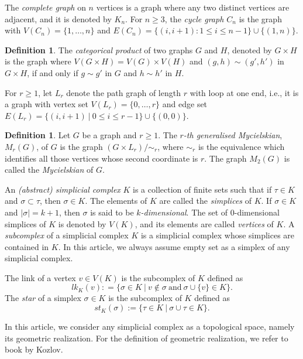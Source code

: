 \documentclass[12pt]{article}
\numberwithin{thm}{section}
\theoremstyle{definition}
\newtheorem{defn}[thm]{Definition}
\begin{document}
	The {\it complete graph} on $n$ vertices is a graph where any two distinct vertices are adjacent, and it is denoted by $K_n$. For $n \geq 3$, the {\it cycle graph $C_n$} is the graph with $V(C_n) = \{1, \ldots, n\}$ and $E(C_n) = \{(i, i+1) : 1 \leq i \leq n-1\} \cup \{(1, n)\}$. 


 \begin{defn} \label{def:product}
	The {\it categorical product} of two graphs $G$ and $H$, denoted by $G\times H$ is the graph where $V(G\times H)=V(G)\times V(H)$ and  $(g,h) \sim (g',h')$ in $G\times H$, if and only if $g \sim g'$ in $G$ and $h \sim h'$ in $H$.
\end{defn}

For $r \geq 1$, let $L_r$ denote the path graph of length $r$ with loop at one end, i.e., it is a graph with  vertex set $V(L_r) = \{0, \ldots, r\}$ and  edge set $E(L_r) = \{(i,i+1) \ |  \ 0 \leq i \leq r-1\} \cup \{(0,0)\}$. 

\begin{defn} \label{defn:mycielskian}Let $G$ be  a graph and $r \geq 1$. The {\it $r$-th generalised Mycielskian}, $M_r(G)$, of $G$ is the graph $(G \times L_r) / \sim_{r}$,  where $\sim_r$ is the equivalence which identifies all those vertices whose second coordinate is $r$.  The graph $M_2(G)$ is called the {\it Mycielskian}  of $G$. 
\end{defn} 

An {\it (abstract) simplicial complex} $K$ is a collection of finite sets such that if $\tau \in K$ and $\sigma \subset \tau$, then $\sigma \in K$. The elements  of $K$ are called the  {\it simplices} of $K$.  If $\sigma \in K$ and $|\sigma |=k+1$, then $\sigma$ is said to be {\it $k$-dimensional}.  The set of $0$-dimensional simplices of $K$ is denoted by $V(K)$, and its elements are called {\it vertices} of $K$. A {\it subcomplex} of a simplicial complex $K$ is a simplicial complex whose simplices are contained in $K$. In this article, we always assume empty set as a simplex of any simplicial complex. 

The link of a vertex $v \in V(K)$ is the subcomplex of $K$ defined as 
$$
lk_K(v) : = \{\sigma \in K \ | \ v  \notin \sigma \ \text{and} \ \sigma \cup \{v\} \in K\}.
$$
The {\it star} of a simplex $\sigma \in K$ is the subcomplex of $K$ defined as
$$
st_K(\sigma):= \{\tau \in K \ |  \ \sigma \cup \tau \in K\}.
$$

	In this article, we consider any simplicial complex as a topological space, namely its  geometric realization. For the definition of geometric realization, we refer to  book \cite{dk} by  Kozlov.
\end{document}
